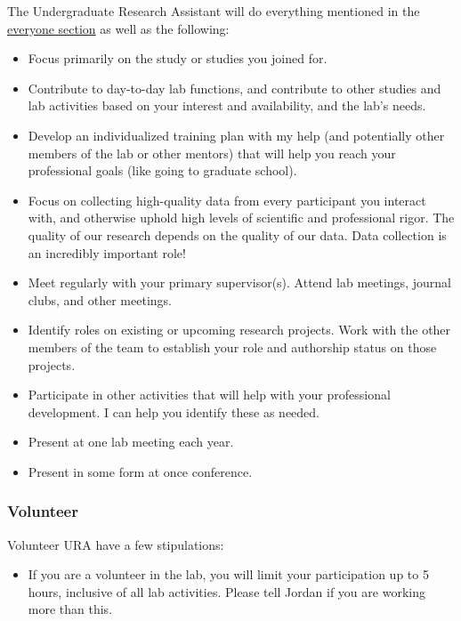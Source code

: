 \documentclass[
]{book}
\providecommand{\tightlist}{%
  \setlength{\itemsep}{0pt}\setlength{\parskip}{0pt}}
\begin{document}
The Undergraduate Research Assistant will do everything mentioned in the \protect\hyperlink{everyone}{everyone section} as well as the following:

\begin{itemize}
\item
  Focus primarily on the study or studies you joined for.
\item
  Contribute to day-to-day lab functions, and contribute to other studies and lab activities based on your interest and availability, and the lab's needs.
\item
  Develop an individualized training plan with my help (and potentially other members of the lab or other mentors) that will help you reach your professional goals (like going to graduate school).
\item
  Focus on collecting high-quality data from every participant you interact with, and otherwise uphold high levels of scientific and professional rigor. The quality of our research depends on the quality of our data. Data collection is an incredibly important role!
\item
  Meet regularly with your primary supervisor(s). Attend lab meetings, journal clubs, and other meetings.
\item
  Identify roles on existing or upcoming research projects. Work with the other members of the team to establish your role and authorship status on those projects.
\item
  Participate in other activities that will help with your professional development. I can help you identify these as needed.
\item
  Present at one lab meeting each year.
\item
  Present in some form at once conference.
\end{itemize}

\hypertarget{volunteer}{%
\subsubsection{Volunteer}\label{volunteer}}

Volunteer URA have a few stipulations:

\begin{itemize}
\tightlist
\item
  If you are a volunteer in the lab, you will limit your participation up to 5 hours, inclusive of all lab activities. Please tell Jordan if you are working more than this.
\end{itemize}
\end{document}
